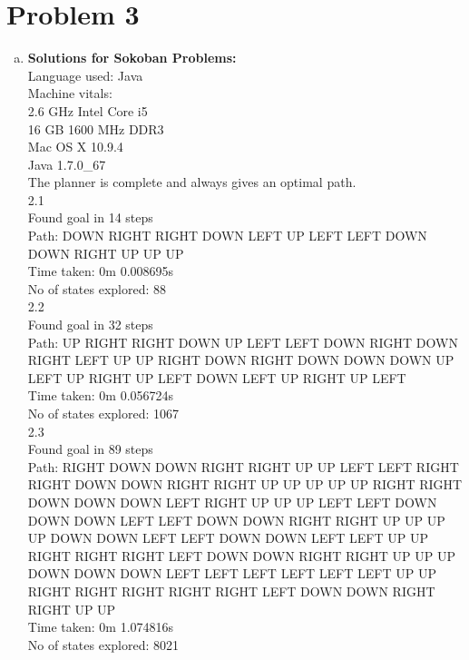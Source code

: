 \documentclass[]{article}
\begin{document}
\section{Problem 3}
	\begin{enumerate}[(a)]
		\item \textbf{Solutions for Sokoban Problems:}\\
		Language used: Java\\
		
		Machine vitals:\\
		2.6 GHz Intel Core i5\\
		16 GB 1600 MHz DDR3\\
		Mac OS X 10.9.4\\
		Java 1.7.0\_67\\
		
		The planner is complete and always gives an optimal path.\\
		2.1\\
		Found goal in 14 steps\\
		Path: DOWN RIGHT RIGHT DOWN LEFT UP LEFT LEFT DOWN DOWN RIGHT UP UP UP\\
		Time taken: 0m 0.008695s\\
		No of states explored: 88\\
		
		2.2\\
		Found goal in 32 steps\\
		Path: UP RIGHT RIGHT DOWN UP LEFT LEFT DOWN RIGHT DOWN RIGHT LEFT UP UP RIGHT DOWN RIGHT DOWN DOWN DOWN UP LEFT UP RIGHT UP LEFT DOWN LEFT UP RIGHT UP LEFT\\
		Time taken: 0m 0.056724s\\
		No of states explored: 1067\\
		
		2.3\\
		Found goal in 89 steps\\
		Path: RIGHT DOWN DOWN RIGHT RIGHT UP UP LEFT LEFT RIGHT RIGHT DOWN DOWN RIGHT RIGHT UP UP UP UP UP RIGHT RIGHT DOWN DOWN DOWN LEFT RIGHT UP UP UP LEFT LEFT DOWN DOWN DOWN LEFT LEFT DOWN DOWN RIGHT RIGHT UP UP UP UP DOWN DOWN LEFT LEFT DOWN DOWN LEFT LEFT UP UP RIGHT RIGHT RIGHT LEFT DOWN DOWN RIGHT RIGHT UP UP UP DOWN DOWN DOWN LEFT LEFT LEFT LEFT LEFT LEFT UP UP RIGHT RIGHT RIGHT RIGHT RIGHT LEFT DOWN DOWN RIGHT RIGHT UP UP\\
		Time taken: 0m 1.074816s\\
		No of states explored: 8021\\
		

\end{enumerate}
\end{document}
